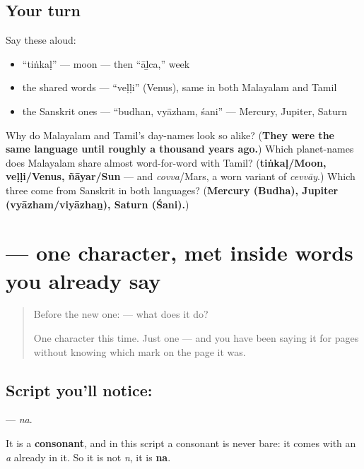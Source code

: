 \subsection*{Your turn}
Say these aloud:

\begin{itemize}
\raggedright
  \item \textquotedblleft{}tiṅkaḷ\textquotedblright{} — moon — then \textquotedblleft{}āḻca,\textquotedblright{} week
  \item the shared words — \textquotedblleft{}veḷḷi\textquotedblright{} (Venus), same in both Malayalam and Tamil
  \item the Sanskrit ones — \textquotedblleft{}budhan, vyāzham, śani\textquotedblright{} — Mercury, Jupiter, Saturn
\end{itemize}

\begin{tcolorbox}[breakable,colback=teal!4,colframe=teal!35!black,title={Before you move on}]
Why do Malayalam and Tamil's day-names look so alike? (\textbf{They were the same language until roughly a thousand years ago.}) Which planet-names does Malayalam share almost word-for-word with Tamil? (\textbf{tiṅkaḷ/Moon, veḷḷi/Venus, ñāyar/Sun} — and \emph{covva}/Mars, a worn variant of \emph{cevvāy}.) Which three come from Sanskrit in both languages? (\textbf{Mercury (Budha), Jupiter (vyāzham/viyāzhaṉ), Saturn (Śani).})
\end{tcolorbox}
\section[\texorpdfstring{\ml{ന} (na)}{ന (na)}]{ — one character, met inside words you already say}

\label{lesson:ML-S05-letter-na}



\begin{quote}
Before the new one:  — what does it do?

One character this time. Just one — and you have been saying it for pages without knowing which mark on the page it was.
\end{quote}

\subsection*{Script you'll notice: }
\textbf{} — \emph{na}.

It is a \textbf{consonant}, and in this script a consonant is never bare: it comes with an \emph{a} already in it. So it is not \emph{n}, it is \textbf{na}.

